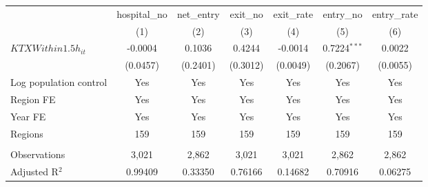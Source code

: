 \begingroup
\centering
\begin{tabular}{lcccccc}
   \toprule
                          & hospital\_no  & net\_entry  & exit\_no  & exit\_rate  & entry\_no      & entry\_rate \\    
                          & (1)           & (2)         & (3)       & (4)         & (5)            & (6)\\  
   \midrule 
   $KTXWithin1.5h_{it}$   & -0.0004       & 0.1036      & 0.4244    & -0.0014     & 0.7224$^{***}$ & 0.0022\\   
                          & (0.0457)      & (0.2401)    & (0.3012)  & (0.0049)    & (0.2067)       & (0.0055)\\   
   Log population control & Yes           & Yes         & Yes       & Yes         & Yes            & Yes\\  
   Region FE              & Yes           & Yes         & Yes       & Yes         & Yes            & Yes\\  
   Year FE                & Yes           & Yes         & Yes       & Yes         & Yes            & Yes\\  
   Regions                & 159           & 159         & 159       & 159         & 159            & 159\\  
    \\
   Observations           & 3,021         & 2,862       & 3,021     & 3,021       & 2,862          & 2,862\\  
   Adjusted R$^2$         & 0.99409       & 0.33350     & 0.76166   & 0.14682     & 0.70916        & 0.06275\\  
   \bottomrule
\end{tabular}
\par\endgroup
